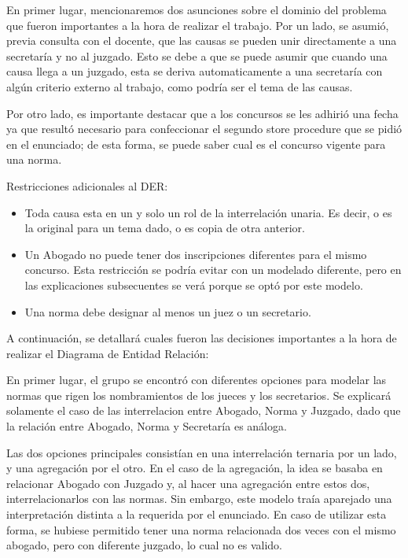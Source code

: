 En primer lugar, mencionaremos dos asunciones sobre el dominio del problema que fueron importantes a la hora de realizar el trabajo.
Por un lado, se asumi\'o, previa consulta con el docente, que las causas se pueden unir directamente a una secretar\'ia y no al juzgado. 
Esto se debe a que se puede asumir que cuando una causa llega a un juzgado, esta se deriva automaticamente a una secretar\'ia 
con alg\'un criterio externo al trabajo, como podr\'ia ser el tema de las causas.

Por otro lado, es importante destacar que a los concursos se les adhiri\'o una fecha ya que
result\'o necesario para confeccionar el segundo store procedure que se pidi\'o en el enunciado; 
de esta forma, se puede saber cual es el concurso vigente para una norma.


\bigskip

Restricciones adicionales al DER:

\begin{itemize}
\item Toda causa esta en un y solo un rol de la interrelación unaria. Es decir, o es la original para un tema dado, o es copia de otra anterior.
\item Un Abogado no puede tener dos inscripciones diferentes para el mismo concurso. Esta restricción se podría evitar con un modelado diferente, pero en las explicaciones subsecuentes se verá porque se optó por este modelo.
\item Una norma debe designar al menos un juez o un secretario.
\end{itemize}



A continuación, se detallará cuales fueron las decisiones importantes a la hora de realizar el Diagrama de Entidad Relación:


En primer lugar, el grupo se encontró con diferentes opciones para modelar las normas que rigen los nombramientos de los jueces y los secretarios. 
Se explicará solamente el caso de las interrelacion entre Abogado, Norma y Juzgado, dado que la relación entre Abogado, Norma y Secretaría es análoga.

Las dos opciones principales consistían en una interrelación ternaria por un lado, y una agregación por el otro.
En el caso de la agregación, la idea se basaba en relacionar Abogado con Juzgado y, al hacer una agregación entre estos dos, interrelacionarlos con las normas. Sin embargo, este modelo traía aparejado una interpretación distinta a la requerida por el enunciado. En caso de utilizar esta forma, se hubiese permitido tener una norma relacionada dos veces con el mismo abogado, pero con diferente juzgado, lo cual no es valido. 

